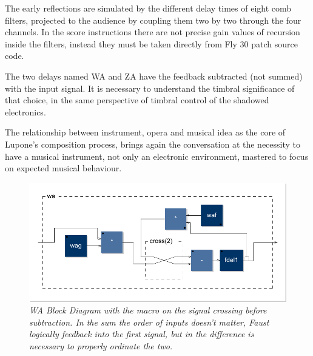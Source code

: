 \documentclass[twoside,a4paper]{article}
\begin{document}
 

The early reflections are simulated by the different delay times of eight comb filters, projected to the audience by coupling them two by two through the four channels. In the score instructions there are not precise gain values of recursion inside the filters, instead they must be taken directly from Fly 30 patch source code.

The two delays named WA and ZA have the feedback subtracted (not summed) with the input signal. It is necessary to understand the timbral significance of that choice, in the same perspective of timbral control of the shadowed electronics. 

The relationship between instrument, opera and musical idea as the core of Lupone's composition process, brings again the conversation at the necessity to have a musical instrument, not only an electronic environment, mastered to focus on expected musical behaviour. 



\begin{figure}[ht]
\centerline{\includegraphics[width=.45\textwidth]{img/wa}}
\caption{\label{wa-block}{\it WA Block Diagram with the macro on the signal crossing before subtraction. In the sum the order of inputs doesn't matter, Faust logically feedback into the first signal, but in the difference is necessary to properly ordinate the two.}}
\end{figure}

\end{document}
